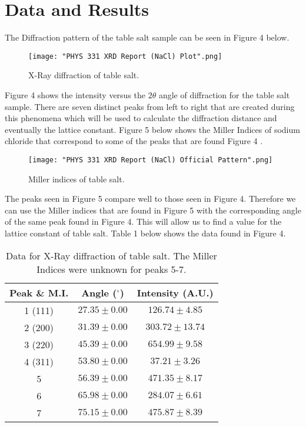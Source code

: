 \documentclass[twocolumn]{article}
\begin{document}
\section*{Data and Results}
The Diffraction pattern of the table salt sample can be seen in Figure 4 below.
\begin{figure}[htbp]
\begin{center}
\texttt{[image: "PHYS 331 XRD Report (NaCl) Plot".png]}
\caption{X-Ray diffraction of table salt.}
\label{Fig4}
\end{center}
\end{figure}
\newline
Figure 4 shows the intensity versus the $2\theta$ angle of diffraction for the table salt sample. There are seven distinct peaks from left to right that are created during this phenomena which will be used to calculate the diffraction distance and eventually the lattice constant. Figure 5 below shows the Miller Indices of sodium chloride that correspond to some of the peaks that are found Figure 4 \cite{Lecture}.
\begin{figure}[htbp]
\begin{center}
\texttt{[image: "PHYS 331 XRD Report (NaCl) Official Pattern".png]}
\caption{Miller indices of table salt.}
\label{Fig5}
\end{center}
\end{figure}
\newline
The peaks seen in Figure 5 compare well to those seen in Figure 4. Therefore we can use the Miller indices that are found in Figure 5 with the corresponding angle of the same peak found in Figure 4. This will allow us to find a value for the lattice constant of table salt. Table 1 below shows the data found in Figure 4.
\begin{table}[htp]
\begin{center}
\begin{tabular}{|c|c|c|}
	\hline \small{\textbf{Peak \& M.I.}} & \small{\textbf{Angle ($^{\circ}$)}} & \small{\textbf{Intensity (A.U.)}} \\ \hline
	1 (111)& $27.35\pm0.00$ & $126.74\pm4.85$ \\ \hline
	2 (200)& $31.39\pm0.00$ & $303.72\pm13.74$ \\ \hline
	3 (220)& $45.39\pm0.00$ & $654.99\pm9.58$ \\ \hline
	4 (311)& $53.80\pm0.00$ & $37.21\pm3.26$ \\ \hline
	5 & $56.39\pm0.00$ & $471.35\pm8.17$ \\ \hline
	6 & $65.98\pm0.00$ & $284.07\pm6.61$ \\ \hline
	7 & $75.15\pm0.00$ & $475.87\pm8.39$ \\ \hline 
\end{tabular}
\caption{Data for X-Ray diffraction of table salt. The Miller Indices were unknown for peaks 5-7.}
\end{center}
\label{default}
\end{table}%
\end{document}

